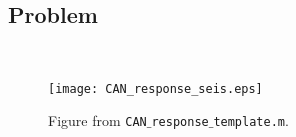 \documentclass[11pt,titlepage,fleqn]{article}
\newcommand{\tfile}{{\tt lab$\_$response.m}}
\begin{document}

\subsection*{Problem} \howmuchtime\

\pagebreak




%

\begin{figure}
\hspace{-1cm}
\texttt{[image: CAN\_response\_seis.eps]}
\caption[]
{{
Figure from {\tt CAN$\_$response$\_$template.m}.
}}
\label{fig:seis}
\end{figure}

\end{document}
